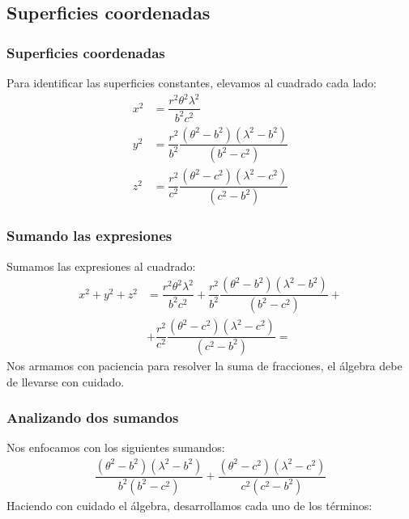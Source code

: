 \documentclass[12pt]{beamer}
\begin{document}
\subsection{Superficies coordenadas}

\begin{frame}
\frametitle{Superficies coordenadas}
Para identificar las superficies constantes, elevamos al cuadrado cada lado:
\pause
\begin{align*}
x^{2} &= \dfrac{r^{2} \theta^{2} \lambda^{2}}{b^{2} c^{2}} \\[0.5em]
y^{2} &= \dfrac{r^{2}}{b^{2}} \dfrac{(\theta^{2} - b^{2})(\lambda^{2} - b^{2})}{(b^{2} - c^{2})} \\[0.5em]
z^{2} &= \dfrac{r^{2}}{c^{2}} \dfrac{(\theta^{2} - c^{2})(\lambda^{2} - c^{2})}{(c^{2} - b^{2})}
\end{align*}
\end{frame}
\begin{frame}
\frametitle{Sumando las expresiones}
Sumamos las expresiones al cuadrado:
\begin{align*}
x^{2} + y^{2} + z^{2} &= \dfrac{r^{2} \theta^{2} \lambda^{2}}{b^{2} c^{2}} + \dfrac{r^{2}}{b^{2}} \dfrac{(\theta^{2} - b^{2})(\lambda^{2} - b^{2})}{(b^{2} - c^{2})} + \\[0.5em]
&+ \dfrac{r^{2}}{c^{2}} \dfrac{(\theta^{2} - c^{2})(\lambda^{2} - c^{2})}{(c^{2} - b^{2})} =
\end{align*}
\pause
Nos armamos con paciencia para resolver la suma de fracciones, el álgebra debe de llevarse con cuidado.
\end{frame}
\begin{frame}
\frametitle{Analizando dos sumandos}
Nos enfocamos con los siguientes sumandos:
\pause
\begin{align*}
\dfrac{(\theta^{2} - b^{2})(\lambda^{2} - b^{2})}{b^{2}(b^{2} - c^{2})} + \dfrac{(\theta^{2} - c^{2})(\lambda^{2} - c^{2})}{c^{2}(c^{2} - b^{2})}
\end{align*}
\pause
Haciendo con cuidado el álgebra, desarrollamos cada uno de los términos:
\end{frame}
\end{document}
